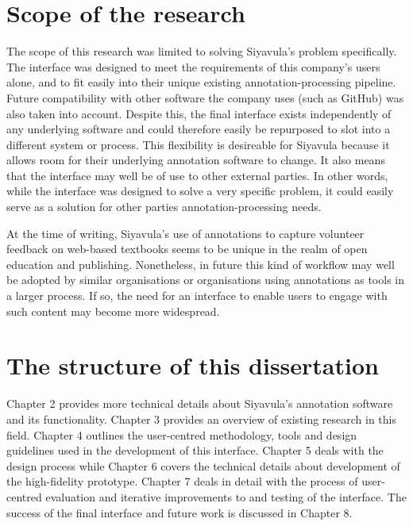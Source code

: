 \section{Scope of the research}
The scope of this research was limited to solving Siyavula's problem specifically. The interface was designed to meet the requirements of this company's users alone, and to fit easily into their unique existing annotation-processing pipeline. Future compatibility with other software the company uses (such as GitHub) was also taken into account. Despite this, the final interface exists independently of any underlying software and could therefore easily be repurposed to slot into a different system or process. This flexibility is desireable for Siyavula because it allows room for their underlying annotation software to change. It also means that the interface may well be of use to other external parties. In other words, while the interface was designed to solve a very specific problem, it could easily serve as a solution for other parties annotation-processing needs. 

At the time of writing, Siyavula's use of annotations to capture volunteer feedback on web-based textbooks seems to be unique in the realm of open education and publishing. Nonetheless, in future this kind of workflow may well be adopted by similar organisations or organisations using annotations as tools in a larger process. If so, the need for an interface to enable users to engage with such content may become more widespread. 


\section{The structure of this dissertation}

Chapter 2 provides more technical details about Siyavula's annotation software and its functionality. Chapter 3 provides an overview of existing research in this field. Chapter 4 outlines the user-centred methodology, tools and design guidelines used in the development of this interface. Chapter 5 deals with the design process while Chapter 6 covers the technical details about development of the high-fidelity prototype. Chapter 7 deals in detail with the process of user-centred evaluation and iterative improvements to and testing of the interface. The success of the final interface and future work is discussed in Chapter 8.   
